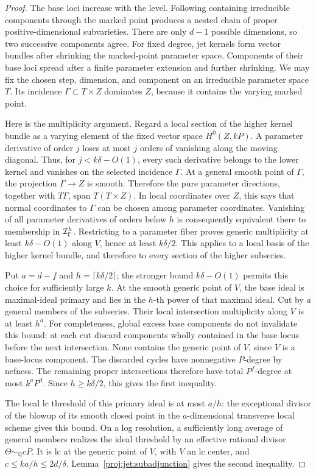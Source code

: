 \documentclass[11pt,letterpaper]{article}
\theoremstyle{definition}
\theoremstyle{remark}
\begin{document}
\begin{proof}
The base loci increase with the level.  Following containing
irreducible components through the marked point produces a nested
chain of proper positive-dimensional subvarieties.  There are only
\(d-1\) possible dimensions, so two successive components agree.
For fixed degree, jet kernels form vector bundles after shrinking
the marked-point parameter space.  Components of their base loci
spread after a finite parameter extension and further shrinking.
We may fix the chosen step, dimension, and component on an
irreducible parameter space \(T\).  Its incidence
\(\Gamma\subset T\times Z\) dominates \(Z\), because it contains the
varying marked point.

Here is the multiplicity argument.  Regard a local section of the
higher kernel bundle as a varying element of the fixed vector space
\(H^0(Z,kP)\).  A parameter derivative of order \(j\) loses at most
\(j\) orders of vanishing along the moving diagonal.  Thus, for
\(j<k\delta-O(1)\), every such derivative belongs to the lower kernel
and vanishes on the selected incidence \(\Gamma\).
At a general smooth point of \(\Gamma\), the projection
\(\Gamma\to Z\) is smooth.  Therefore the pure parameter directions,
together with \(T\Gamma\), span \(T(T\times Z)\).
In local coordinates over \(Z\), this says that normal coordinates
to \(\Gamma\) can be chosen among parameter coordinates.  Vanishing
of all parameter derivatives of orders below \(h\) is consequently
equivalent there to membership in \({\cal I}_\Gamma^h\).
Restricting to a parameter fiber proves generic multiplicity at
least \(k\delta-O(1)\) along \(V\), hence at least \(k\delta/2\).
This applies to a local basis of the higher kernel bundle, and
therefore to every section of the higher subseries.

Put \(a=d-f\) and \(h=\lceil k\delta/2\rceil\); the stronger bound
\(k\delta-O(1)\) permits this choice for sufficiently large \(k\).
At the smooth generic point of
\(V\), the base ideal is maximal-ideal primary and lies in the
\(h\)-th power of that maximal ideal.  Cut by \(a\) general members
of the subseries.  Their local intersection multiplicity along
\(V\) is at least \(h^a\).  For completeness, global excess base
components do not invalidate this bound: at each cut discard
components wholly contained in the base locus before the next
intersection.  None contains the generic point of \(V\), since
\(V\) is a base-locus component.  The discarded cycles have
nonnegative \(P\)-degree by nefness.  The remaining proper
intersections therefore have total \(P^f\)-degree at most
\(k^aP^d\).  Since \(h\ge k\delta/2\), this gives the first inequality.

The local lc threshold of this primary ideal is at most \(a/h\):
the exceptional divisor of the blowup of its smooth closed point
in the \(a\)-dimensional transverse local scheme gives this bound.
On a log resolution, a sufficiently long average of general
members realizes the ideal threshold by an effective rational
divisor \(\Theta\sim_{\mathbb{Q}}cP\).  It is lc at the generic point of
\(V\), with \(V\) an lc center, and
\(c\le k a/h\le2d/\delta\).
Lemma~\ref{proj:jet:subadjunction} gives the second inequality.
\end{proof}
\end{document}
